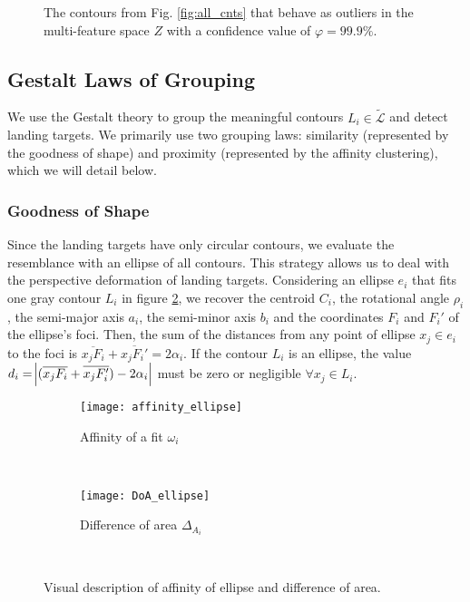 \begin{figure}[!ht]
    \centering
    \caption{The contours from Fig. \ref{fig:all_cnts} that behave as outliers in the multi-feature space $Z$ with a confidence value of $\varphi=99.9\%$.}
    \label{fig:rx_cnts}
\end{figure}

\subsection{Gestalt Laws of Grouping}\label{subsec:Gestalt}
We use the Gestalt theory \citep{Wertheimer:Psycologische:1923} to group the meaningful contours $L_{i}\in \widetilde{\mathcal{L}}$ and detect landing targets. We primarily use two grouping laws: similarity (represented by the goodness of shape) and proximity (represented by the affinity clustering), which we will detail below.

\subsubsection{Goodness of Shape}\label{subsec:similarity}
Since the landing targets have only circular contours, we evaluate the resemblance with an ellipse of all contours. This strategy allows us to deal with the perspective deformation of landing targets. Considering an ellipse $e_{i}$ that fits one gray contour $L_{i}$ in figure \ref{fig:affinity}, we recover the centroid $C_{i}$, the rotational angle $\rho_i$, the semi-major axis $a_i$, the semi-minor axis $b_i$ and the coordinates $F_{i}$ and $F_{i}'$ of the ellipse's foci. Then, the sum of the distances from any point of ellipse $x_{j}\in e_{i}$ to the foci is $\overline{x_{j}F_{i}}+\overline{x_{j}F_{i}'}=2\alpha_{i}$. If the contour $L_{i}$ is an ellipse, the value $d_{i}=\abs{(\overline{x_{j}F_{i}}+\overline{x_{j}F_{i}'})-2\alpha_{i} }$ must be zero or negligible $\forall x_{j}\in L_{i}$. 

\begin{figure}[h]
    \centering
    \begin{subfigure}[b]{0.45\textwidth}
        \texttt{[image: affinity\_ellipse]}
        \caption{Affinity of a fit $\omega_{i}$}
        \label{fig:affinity}
    \end{subfigure}
    ~ %
    \begin{subfigure}[b]{0.5\textwidth}
        \texttt{[image: DoA\_ellipse]}
        \caption{Difference of area $\Delta_{A_{i}}$}
        \label{fig:DoA}
    \end{subfigure}\\
    \caption{Visual description of affinity of ellipse and difference of area.}\label{fig:ressemblance_ellipse}
\end{figure}

